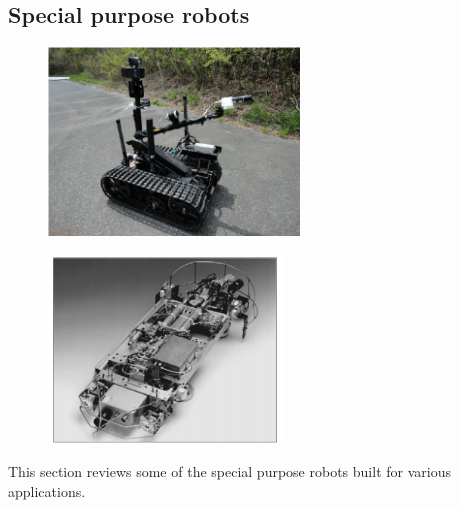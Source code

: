 \subsection{ Special purpose robots}
\begin{figure}
	\centering
	\begin{minipage}{.5\textwidth}
		\centering
		\includegraphics[height=5cm,keepaspectratio]{Chapter2/fig/FukusimaRobot}
		\label{fig:fukuRobot}
	\end{minipage}%
	\begin{minipage}{.5\textwidth}
		\centering
		\includegraphics[width=1\linewidth,height=5cm,keepaspectratio]{Chapter2/fig/nero3}
		\label{fig:nero3}
	\end{minipage}
\end{figure}
This section reviews some of the special purpose  robots built for various applications. 
